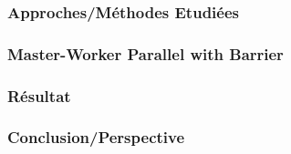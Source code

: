 \documentclass[10pt]{beamer}
\begin{document}
    
    
    \begin{frame}
        \frametitle{Approches/Méthodes Etudiées}
        
    \end{frame}
    
    
    \begin{frame}
        \frametitle{Master-Worker Parallel with Barrier}            
    \end{frame}
        
    \begin{frame}
        \frametitle{Résultat}
    \end{frame}
        
    \begin{frame}
        \frametitle{Conclusion/Perspective}
    \end{frame}
    
    \iffalse
    \fi
\end{document}
